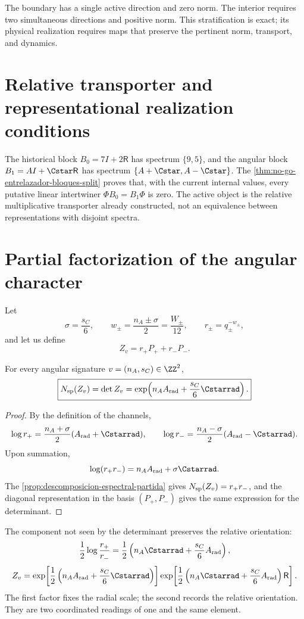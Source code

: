 The boundary has a single active direction and zero norm. The interior requires
two simultaneous directions and positive norm. This stratification is exact;
its physical realization requires maps that preserve the pertinent norm, transport, and
dynamics.

\section{Relative transporter and representational realization conditions}
\label{sec:transportador-relativo-split-md}

The historical block \(B_0=7I+2\mathsf R\) has spectrum \(\{9,5\}\), and the
angular block \(B_1=AI+\Cstar\mathsf R\) has spectrum
\(\{A+\Cstar,A-\Cstar\}\). The
\cref{thm:no-go-entrelazador-bloques-split} proves that, with the current internal
values, every putative linear intertwiner
\(\Phi B_0=B_1\Phi\) is zero. The active object is the relative
multiplicative transporter already constructed, not an equivalence between
representations with disjoint spectra.

\section{Partial factorization of the angular character}
\label{sec:factorizacion-split-angular}

Let
\[
 \sigma=\frac{s_C}{6},\qquad
 w_\pm=\frac{n_A\pm\sigma}{2}=\frac{W_\pm}{12},
 \qquad
 r_\pm=q_\pm^{-w_\pm},
\]
and let us define
\[
 Z_v=r_+P_++r_-P_-.
\]

\begin{theorem}
\label{thm:split-character}
For every angular signature \(v=(n_A,s_C)\in\ZZ^2\),
\[
 \boxed{
 N_{\rm sp}(Z_v)
 =\det Z_v
 =\exp\!\left(
 n_AA_{\rm rad}+\frac{s_C}{6}\Cstarrad
 \right).}
\]
\end{theorem}

\begin{proof}
By the definition of the channels,
\[
 \log r_+
 =\frac{n_A+\sigma}{2}(A_{\rm rad}+\Cstarrad),
 \qquad
 \log r_-
 =\frac{n_A-\sigma}{2}(A_{\rm rad}-\Cstarrad).
\]
Upon summation,
\[
 \log(r_+r_-)
 =n_AA_{\rm rad}+\sigma\Cstarrad.
\]
The \cref{prop:descomposicion-espectral-partida} gives
\(N_{\rm sp}(Z_v)=r_+r_-\), and the diagonal representation in the basis
\((P_+,P_-)\) gives the same expression for the determinant.
\end{proof}

The component not seen by the determinant preserves the relative orientation:
\[
 \frac12\log\frac{r_+}{r_-}
 =\frac12\left(
 n_A\Cstarrad+\frac{s_C}{6}A_{\rm rad}
 \right),
\]
\[
 Z_v=
 \exp\!\left[
 \frac12\left(n_AA_{\rm rad}+\frac{s_C}{6}\Cstarrad\right)
 \right]
 \exp\!\left[
 \frac12\left(n_A\Cstarrad+\frac{s_C}{6}A_{\rm rad}\right)
 \mathsf R
 \right].
\]
The first factor fixes the radial scale; the second records the relative
orientation. They are two coordinated readings of one and the same element.

